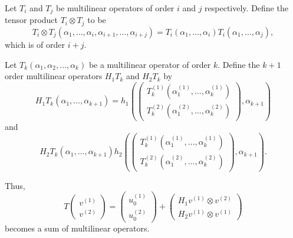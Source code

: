\documentclass[a4paper, 12pt]{article}
\begin{document}
\begin{defn}
	Let $T_{i}$ and $T_{j}$ be multilinear operators of order $i$ and $j$ respectively.
	Define the tensor product $T_{i}\otimes T_{j}$ to be
	\[
	T_{i}\otimes T_{j}\left( \alpha_1,\ldots,\alpha_{i},\alpha_{i + 1}, \ldots, \alpha_{i + j} \right)
	= T_{i}\left(\alpha_1,\ldots,\alpha_{i}\right)  T_{i}\left(\alpha_1,\ldots,\alpha_{j}\right) 
	,\] 
	which is of order $i + j$.
\end{defn}

\begin{defn}\label{H1H2}
	Let $T_{k}\left( \alpha_1,\alpha_2,\ldots,\alpha_{k} \right)$ be a multilinear operator of order $k$.
	Define the $k + 1$ order multilinear operators $H_1T_{k}$ and $H_2T_{k}$
	by
	\[
	H_1T_{k}\left( \alpha_1,\ldots,\alpha_{k + 1} \right) =
	h_1\left( \begin{pmatrix} T_{k}^{(1)}( \alpha_1^{(1)},\ldots,\alpha_{k}^{(1)} )\\T_{k}^{(2)} ( \alpha_1^{(2)},\ldots,\alpha_{k}^{(2)} )\end{pmatrix}  ,\alpha_{k + 1} \right)
	\]
	and
	\[
	H_2T_{k}\left( \alpha_1,\ldots,\alpha_{k + 1} \right)
	h_2\left( \begin{pmatrix} T_{k}^{(1)}( \alpha_1^{(1)},\ldots,\alpha_{k}^{(1)} )\\T_{k}^{(2)} ( \alpha_1^{(2)},\ldots,\alpha_{k}^{(2)} )\end{pmatrix}  ,\alpha_{k + 1} \right)
	.\]
\end{defn}
\noindent Thus,
\[
	T\begin{pmatrix} v^{(1)}\\v^{(2)} \end{pmatrix} = \begin{pmatrix} u_0^{(1)}\\u_0^{(2)} \end{pmatrix} + \begin{pmatrix} H_1 v^{(1)}\otimes v^{(2)} \\H_2 v^{(1)} \otimes v^{(1)}\end{pmatrix}
\]
becomes a sum of multilinear operators.
\end{document}
